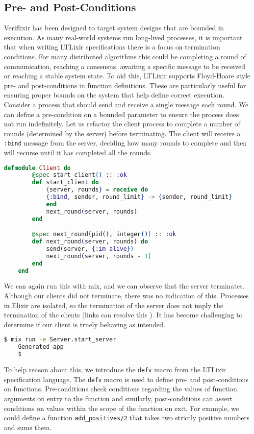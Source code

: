 \subsection{Pre- and Post-Conditions}
Veriflixir has been designed to target system designs that are bounded in execution. As many real-world systems run long-lived processes, it is important that when writing LTLixir specifications there is a focus on termination conditions. For many distributed algorithms this could be completing a round of communication, reaching a consensus, awaiting a specific message to be received or reaching a stable system state. To aid this, LTLixir supports Floyd-Hoare style pre- and post-conditions in function definitions. These are particularly useful for ensuring proper bounds on the system that help define correct execution. Consider a process that should send and receive a single message each round. We can define a pre-condition on a bounded parameter to ensure the process does not run indefinitely. Let us refactor the client process to complete a number of rounds (determined by the server) before terminating. The client will receive a \texttt{:bind} message from the server, deciding how many rounds to complete and then will recurse until it has completed all the rounds.
\begin{lstlisting}[language=Elixir, xleftmargin=.3\linewidth]
    defmodule Client do
        @spec start_client() :: :ok
        def start_client do
            {server, rounds} = receive do
            {:bind, sender, round_limit} -> {sender, round_limit}
            end
            next_round(server, rounds)
        end

        @spec next_round(pid(), integer()) :: :ok
        def next_round(server, rounds) do
            send(server, {:im_alive})
            next_round(server, rounds - 1)
        end
    end
\end{lstlisting}
We can again run this with mix, and we can observe that the server terminates. Although our clients did not terminate, there was no indication of this. Processes in Elixir are isolated, so the termination of the server does not imply the termination of the clients (links can resolve this \cite{elixir_links}). It has become challenging to determine if our client is truely behaving as intended.
\begin{lstlisting}[language=bash, xleftmargin=.3\linewidth]
    $ mix run -e Server.start_server
    Generated app
    $
\end{lstlisting}
To help reason about this, we introduce the \texttt{defv} macro from the LTLixir specification language. The \texttt{defv} macro is used to define pre- and post-conditions on functions. Pre-conditions check conditions regarding the values of function arguments on entry to the function and similarly, post-conditions can assert conditions on values within the scope of the function on exit. For example, we could define a function \texttt{add\_positives/2} that takes two strictly positive numbers and sums them.
